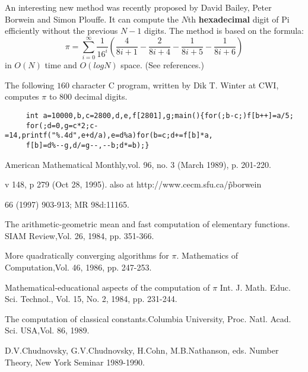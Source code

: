 %
An interesting new method was recently proposed by David Bailey, Peter
Borwein and Simon Plouffe. It can compute the $N$th {\bf hexadecimal}
digit of Pi efficiently without the previous $N-1$ digits. The method is
based on the formula:
\[
  \pi = \sum_{i=0}^\infty \frac{1}{16^i}
  \left(
    \frac{4}{8i+1} - \frac{2}{8i+4} - \frac{1}{8i+5} - \frac{1}{8i+6}
  \right)
\]
in $O(N)$ time and $O(log N)$ space. (See references.)

The following $160$ character C program, written by Dik T. Winter at
CWI, computes $\pi$ to 800 decimal digits.

\begin{verbatim}
     int a=10000,b,c=2800,d,e,f[2801],g;main(){for(;b-c;)f[b++]=a/5;
     for(;d=0,g=c*2;c-=14,printf("%.4d",e+d/a),e=d%a)for(b=c;d+=f[b]*a,
     f[b]=d%--g,d/=g--,--b;d*=b);}
\end{verbatim}


\Ref

 {American Mathematical Monthly,}{vol. 96,
  no. 3 (March 1989), p. 201-220.}

 {v 148, p 279 (Oct 28,
  1995).  also at http://www.cecm.sfu.ca/\~pborwein }

  { 66 (1997)
  903-913; MR 98d:11165.}

  {The arithmetic-geometric mean
  and fast computation of elementary functions.}  {SIAM
  Review,}{Vol. 26, 1984, pp. 351-366.}

  {More quadratically converging
  algorithms for $\pi$.}  {Mathematics of Computation,}{Vol. 46, 1986,
  pp. 247-253.}

 {Mathematical-educational
  aspects of the computation of $\pi$}
{Int. J. Math. Educ. Sci. Technol.,} {Vol. 15, No. 2, 1984,
  pp. 231-244.}

  {The computation of
  classical constants.}{Columbia University,
  Proc. Natl. Acad. Sci. USA,}{Vol. 86, 1989.}

 {D.V.Chudnovsky, G.V.Chudnovsky, H.Cohn,
  M.B.Nathanson, eds.}  {Number Theory, New York Seminar 1989-1990.}

